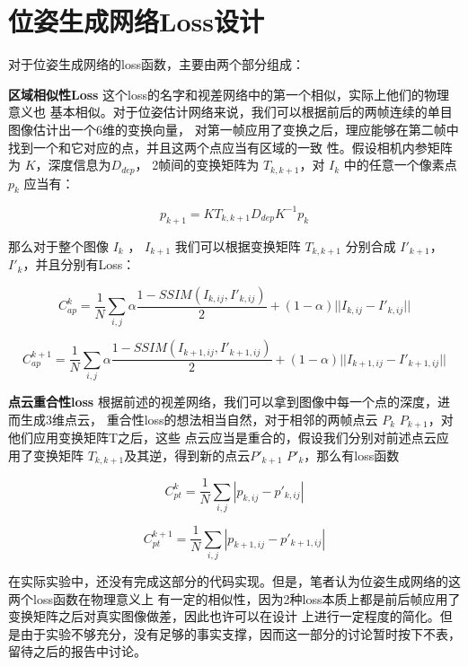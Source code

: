 \section{位姿生成网络Loss设计}

对于位姿生成网络的loss函数，主要由两个部分组成：

\textbf{区域相似性Loss} 这个loss的名字和视差网络中的第一个相似，实际上他们的物理意义也
基本相似。对于位姿估计网络来说，我们可以根据前后的两帧连续的单目图像估计出一个6维的变换向量，
对第一帧应用了变换之后，理应能够在第二帧中找到一个和它对应的点，并且这两个点应当有区域的一致
性。假设相机内参矩阵为 $K$，深度信息为$D_{dep}$，
2帧间的变换矩阵为 $T_{k,k+1}$，对 $I_k$ 中的任意一个像素点 $p_k$ 应当有：

$$ p_{k+1} = K T_{k,k+1} D_{dep} K^{-1} p_k $$ 

那么对于整个图像 $I_k$ ， $I_{k+1}$ 我们可以根据变换矩阵 $T_{k, k+1}$ 分别合成 $I'_{k+1}$，
$I'_{k}$，并且分别有Loss：

$$ C_{ap}^k = \frac{1}{N} \sum_{i,j} \alpha \frac{1 - SSIM(I_{k, ij}, I'_{k, ij})}{2} +
              (1 - \alpha)||I_{k, ij} - I'_{k, ij}|| $$

$$ C_{ap}^{k+1} = \frac{1}{N} \sum_{i,j} \alpha \frac{1 - SSIM(I_{k+1, ij}, I'_{k+1, ij})}{2} +
              (1 - \alpha)||I_{k+1, ij} - I'_{k+1, ij}|| $$
              
\textbf{点云重合性loss} 根据前述的视差网络，我们可以拿到图像中每一个点的深度，进而生成3维点云，
重合性loss的想法相当自然，对于相邻的两帧点云 $P_k$ $P_{k+1}$，对他们应用变换矩阵T之后，这些
点云应当是重合的，假设我们分别对前述点云应用了变换矩阵 $T_{k, k+1}$及其逆，得到新的点云$P'_{k+1}$
$P'_{k}$，那么有loss函数

$$ C_{pt}^k = \frac{1}{N} \sum_{i,j}|p_{k, ij} - p'_{k, ij}| $$

$$ C_{pt}^{k+1} = \frac{1}{N} \sum_{i,j}|p_{k+1, ij} - p'_{k+1, ij}| $$

在实际实验中，还没有完成这部分的代码实现。但是，笔者认为位姿生成网络的这两个loss函数在物理意义上
有一定的相似性，因为2种loss本质上都是前后帧应用了变换矩阵之后对真实图像做差，因此也许可以在设计
上进行一定程度的简化。但是由于实验不够充分，没有足够的事实支撑，因而这一部分的讨论暂时按下不表，
留待之后的报告中讨论。
























